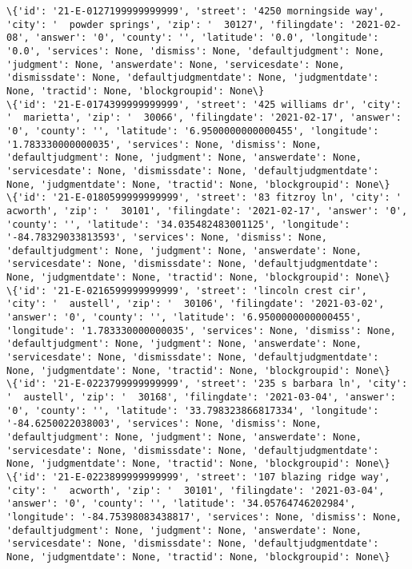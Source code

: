 \documentclass[11pt]{article}
\begin{document}
\begin{Verbatim}[commandchars=\\\{\}]
\{'id': '21-E-0127199999999999', 'street': '4250 morningside way', 'city': '  powder springs', 'zip': '  30127', 'filingdate': '2021-02-08', 'answer': '0', 'county': '', 'latitude': '0.0', 'longitude': '0.0', 'services': None, 'dismiss': None, 'defaultjudgment': None, 'judgment': None, 'answerdate': None, 'servicesdate': None, 'dismissdate': None, 'defaultjudgmentdate': None, 'judgmentdate': None, 'tractid': None, 'blockgroupid': None\}
\{'id': '21-E-0174399999999999', 'street': '425 williams dr', 'city': '  marietta', 'zip': '  30066', 'filingdate': '2021-02-17', 'answer': '0', 'county': '', 'latitude': '6.9500000000000455', 'longitude': '1.783330000000035', 'services': None, 'dismiss': None, 'defaultjudgment': None, 'judgment': None, 'answerdate': None, 'servicesdate': None, 'dismissdate': None, 'defaultjudgmentdate': None, 'judgmentdate': None, 'tractid': None, 'blockgroupid': None\}
\{'id': '21-E-0180599999999999', 'street': '83 fitzroy ln', 'city': '  acworth', 'zip': '  30101', 'filingdate': '2021-02-17', 'answer': '0', 'county': '', 'latitude': '34.035482483001125', 'longitude': '-84.78329033813593', 'services': None, 'dismiss': None, 'defaultjudgment': None, 'judgment': None, 'answerdate': None, 'servicesdate': None, 'dismissdate': None, 'defaultjudgmentdate': None, 'judgmentdate': None, 'tractid': None, 'blockgroupid': None\}
\{'id': '21-E-0216599999999999', 'street': 'lincoln crest cir', 'city': '  austell', 'zip': '  30106', 'filingdate': '2021-03-02', 'answer': '0', 'county': '', 'latitude': '6.9500000000000455', 'longitude': '1.783330000000035', 'services': None, 'dismiss': None, 'defaultjudgment': None, 'judgment': None, 'answerdate': None, 'servicesdate': None, 'dismissdate': None, 'defaultjudgmentdate': None, 'judgmentdate': None, 'tractid': None, 'blockgroupid': None\}
\{'id': '21-E-0223799999999999', 'street': '235 s barbara ln', 'city': '  austell', 'zip': '  30168', 'filingdate': '2021-03-04', 'answer': '0', 'county': '', 'latitude': '33.798323866817334', 'longitude': '-84.6250022038003', 'services': None, 'dismiss': None, 'defaultjudgment': None, 'judgment': None, 'answerdate': None, 'servicesdate': None, 'dismissdate': None, 'defaultjudgmentdate': None, 'judgmentdate': None, 'tractid': None, 'blockgroupid': None\}
\{'id': '21-E-0223899999999999', 'street': '107 blazing ridge way', 'city': '  acworth', 'zip': '  30101', 'filingdate': '2021-03-04', 'answer': '0', 'county': '', 'latitude': '34.05764746202984', 'longitude': '-84.75398083438817', 'services': None, 'dismiss': None, 'defaultjudgment': None, 'judgment': None, 'answerdate': None, 'servicesdate': None, 'dismissdate': None, 'defaultjudgmentdate': None, 'judgmentdate': None, 'tractid': None, 'blockgroupid': None\}

\end{Verbatim}
\end{document}
